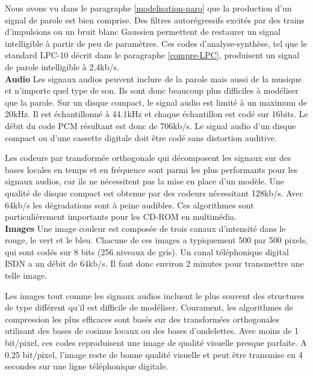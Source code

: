Nous avons vu dans le paragraphe \ref{modelisation-paro} que
la production d'un signal de parole est bien comprise. 
Des filtres autor\'egressifs 
excit\'es par des trains d'impulsions ou un bruit
blanc Gaussien 
permettent de restaurer un signal
intelligible \`a partir de peu de param\`etres.
Ces codes d'analyse-synth\`ese, tel que le standard LPC-10 d\'ecrit
dans le paragraphe \ref{compre-LPC},
produisent un signal de parole intelligible
\`a 2,4kb/s. \\

{\bf Audio}
Les signaux audios peuvent inclure de la parole mais aussi de la
musique et n'importe quel type de son.
Ils sont donc beaucoup plus difficiles \`a mod\'eliser que la parole.
Sur un disque compact, le signal audio est limit\'e \`a un maximum 
de 20kHz. Il est \'echantillonn\'e \`a 44.1kHz et chaque \'echantillon est
cod\'e sur 16bits. Le d\'ebit du code PCM r\'esultant est donc de
706kb/s. Le signal audio d'un disque compact ou d'une cassette
digitale doit \^etre cod\'e sans distortion auditive.

Les codeurs par transform\'ee orthogonale qui d\'ecomposent les
signaux sur des bases locales en temps et en fr\'equence sont
parmi les plus performants pour les signaux audios, car ils ne
n\'ecessitent pas la mise en place d'un mod\`ele.
Une qualit\'e de disque compact est obtenue par des codeurs
n\'ecessitant 128kb/s.
Avec 64kb/s les d\'egradations sont \`a peine audibles.
Ces algorithmes sont particuli\`erement importants pour les 
CD-ROM en multim\'edia.\\

{\bf Images}
Une image couleur est compos\'ee de trois canaux d'intensit\'e 
dans le rouge, le vert et le bleu.
Chacune de ces images a typiquement
500 par 500 pixels, qui sont cod\'es sur 8 bits (256 niveaux de gris).
Un canal t\'el\'ephonique digital ISDN  a un d\'ebit de 64kb/s.
Il faut donc environ 2 minutes pour transmettre une telle image. 

Les images tout comme les signaux audios incluent le plus souvent
des structures de type diff\'erent qu'il est difficile de mod\'eliser.
Courament, les algorithmes de compression les plus efficaces sont
bas\'es sur des transform\'ees orthogonales utilisant des bases de
cosinus locaux ou des bases d'ondelettes.
Avec moins de 1 bit/pixel, ces codes reproduisent une image
de qualit\'e visuelle presque parfaite.
A 0.25 bit/pixel, l'image reste de bonne qualit\'e visuelle et
peut \^etre transmise en 4 secondes sur une ligne t\'el\'ephonique
digitale.

